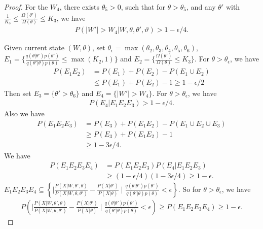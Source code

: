 \begin{proof}
For the $W_4$, there exists $\theta_5 > 0$, such that for $\theta > \theta_5$, and any $\theta'$ with $\frac{1}{K_3}  \leq \frac{\Omega(\theta')}{\Omega(\theta)}  \leq K_3$, we have \begin{align*}
P(|W'| > W_4 | W, \theta, \theta', \vartheta) > 1- \epsilon / 4.
\end{align*}



Given current state $(W, \theta)$, set $\theta_\epsilon = \max(\theta_2,\theta_3, \theta_4, \theta_5, \theta_6)$,  $E_1 = \{ \frac{q(\theta | \theta')p(\theta')}{q(\theta' | \theta)p(\theta)} \leq \max(K_2, 1) \}$ and $E_2 = \{ \frac{\Omega(\theta')}{\Omega(\theta)}  \leq K_3\}$.
For $\theta > \theta_\epsilon$, we have 
\begin{align*}
P(E_1E_2) &= P(E_1) + P(E_2) - P(E_1 \cup E_2) \\
& \le P(E_1) + P(E_2) - 1\ge 1 - \epsilon / 2
\end{align*}
Then set $E_3 = \{ \theta' > \theta_6\}$ and $E_4= \{ |W'| > W_4\}$. For $\theta > \theta_\epsilon$, we have 
\begin{align*}
P(E_4 | E_1E_2E_3) > 1- \epsilon / 4.
\end{align*}
Also we have 
\begin{align*}
P(E_1E_2E_3) &= P(E_3) + P(E_1E_2) - P(E_1 \cup E_2 \cup E_3)\\
&\ge  P(E_3) + P(E_1E_2) - 1\\
&\ge 1 - 3\epsilon /4. 
\end{align*}
We have \begin{align*}
P(E_1E_2E_3E_4) &= P(E_1E_2E_3) P(E_4 | E_1E_2E_3)\\
&\ge (1 - \epsilon / 4) (1 - 3 \epsilon / 4) \ge 1 - \epsilon.
\end{align*}
$E_1E_2E_3E_4 \subseteq \left\lbrace \mid \frac{P(X | W, \theta' , \theta)}{P(X | W, \theta , \theta')} - \frac{P(X | \theta')}{P(X | \theta)} \mid \frac{q(\theta | \theta')p(\theta')}{q(\theta' | \theta)p(\theta)} < \epsilon \right\rbrace $.
So for $\theta > \theta_\epsilon$, we have
\begin{align*}
P(\mid \frac{P(X | W, \theta' , \theta)}{P(X | W, \theta , \theta')} - \frac{P(X | \theta')}{P(X | \theta)} \mid \frac{q(\theta | \theta')p(\theta')}{q(\theta' | \theta)p(\theta)} < \epsilon) \ge P(E_1E_2E_3E_4) \ge 1- \epsilon.
\end{align*}


\end{proof}
